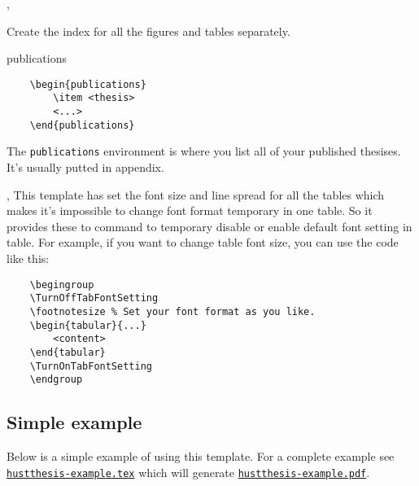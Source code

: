 \documentclass[12pt,a4paper,numbered,full]{l3doc}
\begin{document}
\begin{function}{\listoffigures,\listoftables}
    Create the index for all the figures and tables separately.
\end{function}

\begin{environment}{publications}
    \begin{verbatim}
    \begin{publications}
        \item <thesis>
        <...>
    \end{publications}
    \end{verbatim}
    The \verb+publications+ environment is where you list all of your published thesises. It's usually putted in appendix. 
\end{environment}

\begin{function}{\TurnOffTabFontSetting,\TurnOnTabFontSetting}
    This template has set the font size and line spread for all the tables which makes it's impossible to change font format temporary in one table.  So it provides these to command to temporary disable or enable default font setting in table. For example, if you want to change table font size, you can use the code like this:
    \begin{verbatim}
    \begingroup
    \TurnOffTabFontSetting
    \footnotesize % Set your font format as you like.
    \begin{tabular}{...}
        <content>
    \end{tabular}
    \TurnOnTabFontSetting
    \endgroup
    \end{verbatim}
\end{function}

\subsection{Simple example}\label{subsec:simple-example}
Below is a simple example of using this template. For a complete example see \href{https://github.com/michael911009/HUSTThesis-en/blob/master/example/hustthesis-en-example.tex}{\texttt{hustthesis-example.tex}} which will generate \href{https://github.com/michael911009/HUSTThesis-en/raw/master/example/hustthesis-en-example.pdf}{\texttt{hustthesis-example.pdf}}.
\end{document}
